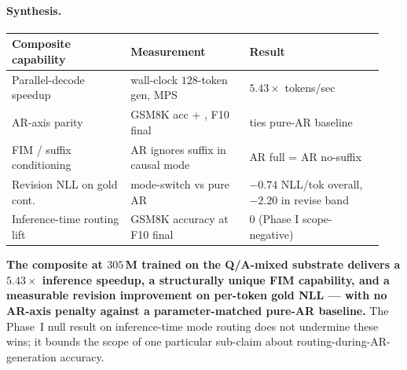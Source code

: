 \paragraph{Synthesis.}
\begin{center}
\small
\begin{tabular}{@{}p{0.30\linewidth}p{0.30\linewidth}p{0.34\linewidth}@{}}
\toprule
Composite capability & Measurement & Result \\
\midrule
Parallel-decode speedup & wall-clock $128$-token gen, MPS & $\mathbf{5.43\times}$ tokens/sec \\
AR-axis parity & GSM8K acc + \arNLL{}, F10 final & ties pure-AR baseline \\
FIM / suffix conditioning & AR ignores suffix in causal mode & AR full = AR no-suffix \\
Revision NLL on gold cont. & mode-switch vs pure AR & $\mathbf{-0.74}$ NLL/tok overall, $\mathbf{-2.20}$ in revise band \\
Inference-time routing lift & GSM8K accuracy at F10 final & $0$ (Phase I scope-negative) \\
\bottomrule
\end{tabular}
\end{center}

\textbf{The composite at $305$\,M trained on the Q/A-mixed substrate
delivers a $5.43\times$ inference speedup, a structurally unique FIM
capability, and a measurable revision improvement on per-token gold
NLL --- with no AR-axis penalty against a parameter-matched pure-AR
baseline.} The Phase~I null result on inference-time mode routing
does not undermine these wins; it bounds the scope of one particular
sub-claim about routing-during-AR-generation accuracy.
